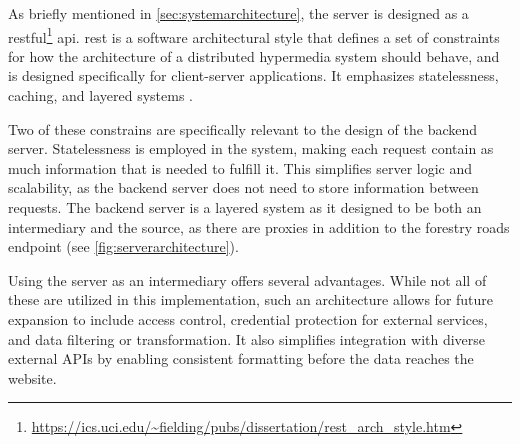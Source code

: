 As briefly mentioned in \autoref{sec:systemarchitecture}, the server is designed as a \acrshort{rest}ful\footnote{\url{https://ics.uci.edu/~fielding/pubs/dissertation/rest_arch_style.htm}} \acrshort{api}. \acrfull{rest} is a software architectural style that defines a set of constraints for how the architecture of a distributed hypermedia system should behave, and is designed specifically for client-server applications. It emphasizes statelessness, caching, and layered systems \cite{restwiki}. 

Two of these constrains are specifically relevant to the design of the backend server. Statelessness is employed in the system, making each request contain as much information that is needed to fulfill it. This simplifies server logic and scalability, as the backend server does not need to store information between requests. The backend server is a layered system as it designed to be both an intermediary and the source, as there are proxies in addition to the forestry roads endpoint (see \autoref{fig:serverarchitecture}).

Using the server as an intermediary offers several advantages. While not all of these are utilized in this implementation, such an architecture allows for future expansion to include access control, credential protection for external services, and data filtering or transformation. It also simplifies integration with diverse external APIs by enabling consistent formatting before the data reaches the website.

